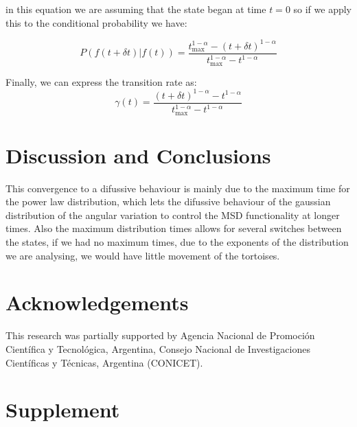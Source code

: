 \documentclass[a4paper]{article}
\begin{document}
in this equation we are assuming that the state began at time $t=0$ so if we apply this to the conditional probability we have:

\begin{equation}
    P(f(t+\delta t)|f(t)) = \frac{t_{\text{max}}^{1-\alpha}-(t+\delta t)^{1-\alpha}}{t_{\text{max}}^{1-\alpha}-t^{1-\alpha}} 
\end{equation}

Finally, we can express the transition rate as:
\begin{equation}
    \gamma (t)=\frac{(t+\delta t)^{1-\alpha}-t^{1-\alpha}}{t_{\text{max}}^{1-\alpha}-t^{1-\alpha}} 
\end{equation}





\section*{Discussion and Conclusions}


This convergence to a difussive behaviour is mainly due to the maximum time for the power law distribution, which lets the difussive behaviour of the gaussian
distribution of the angular variation to control the MSD functionality at longer times. Also the maximum distribution times allows for several switches between the states,
if we had no maximum times, due to the exponents of the distribution we are analysing, we would have little movement of the tortoises. 




\section{Acknowledgements}
 This research was partially supported by Agencia Nacional de Promoción Científica y Tecnológica, Argentina, Consejo Nacional de Investigaciones Científicas y Técnicas, Argentina (CONICET).



\renewcommand{\thesection}{S\arabic{section}}
\renewcommand{\thetable}{S\arabic{table}}
\renewcommand{\thefigure}{S\arabic{figure}}
\renewcommand{\theequation}{S\arabic{equation}}
\setcounter{equation}{0}
\setcounter{section}{0}
\setcounter{table}{0}
\setcounter{page}{1}
\setcounter{figure}{0}

\newpage

\section*{Supplement}
\end{document}
